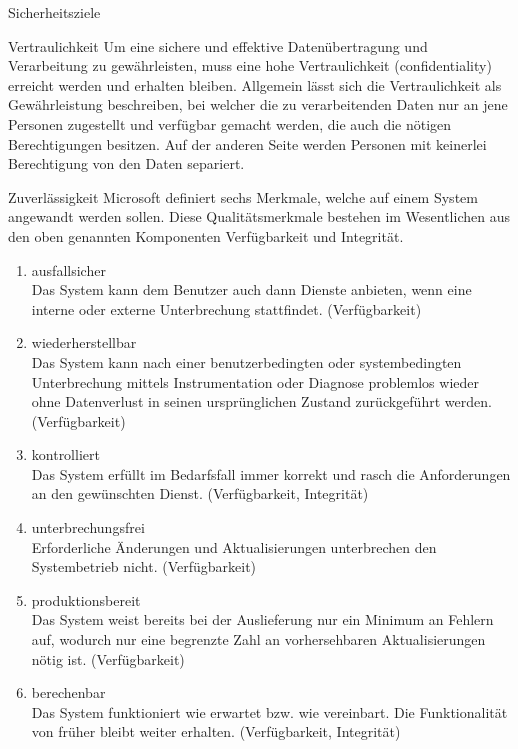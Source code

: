 \begin{section}{Sicherheitsziele}
   \label{Vertraulichkeit}
   \begin{subsection}{Vertraulichkeit}
    Um eine sichere und effektive Datenübertragung und Verarbeitung zu gewährleisten, muss 
    eine hohe Vertraulichkeit (confidentiality) erreicht werden und erhalten bleiben. 
    Allgemein lässt sich die Vertraulichkeit als Gewährleistung beschreiben, bei welcher die 
    zu verarbeitenden Daten nur an jene Personen zugestellt und verfügbar gemacht werden, die 
    auch die nötigen Berechtigungen besitzen. Auf der anderen Seite werden Personen mit 
    keinerlei Berechtigung von den Daten separiert.
    \\
    \end{subsection}

    \label{Zuverlässigkeit}
    \begin{subsection}{Zuverlässigkeit}
     Microsoft definiert sechs Merkmale, welche auf einem System angewandt werden sollen. 
     Diese Qualitätsmerkmale bestehen im Wesentlichen aus den oben genannten Komponenten 
     Verfügbarkeit und Integrität.
     \begin{enumerate} 
      \item ausfallsicher \\
       Das System kann dem Benutzer auch dann Dienste anbieten, wenn eine interne oder 
       externe Unterbrechung stattfindet. (Verfügbarkeit)
      \item wiederherstellbar \\
       Das System kann nach einer benutzerbedingten oder systembedingten Unterbrechung 
       mittels Instrumentation oder Diagnose problemlos wieder ohne Datenverlust in seinen 
       ursprünglichen Zustand zurückgeführt werden. (Verfügbarkeit)
      \item kontrolliert \\
       Das System erfüllt im Bedarfsfall immer korrekt und rasch die Anforderungen an den 
       gewünschten Dienst. (Verfügbarkeit, Integrität)
      \item unterbrechungsfrei \\
       Erforderliche Änderungen und Aktualisierungen unterbrechen den Systembetrieb nicht. 
       (Verfügbarkeit)
      \item produktionsbereit \\
       Das System weist bereits bei der Auslieferung nur ein Minimum an Fehlern auf, 
       wodurch nur eine begrenzte Zahl an vorhersehbaren Aktualisierungen nötig ist. 
       (Verfügbarkeit)
      \item berechenbar \\
       Das System funktioniert wie erwartet bzw. wie vereinbart. Die Funktionalität von 
       früher bleibt weiter erhalten. (Verfügbarkeit, Integrität) \\
      \cite{Micro05}
     \end{enumerate}
    \end{subsection}
  \end{section}


